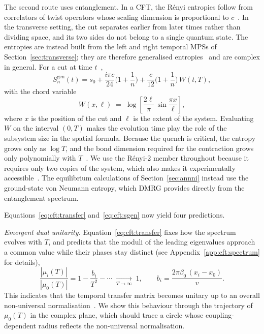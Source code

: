 The second route uses entanglement. In a \ac{CFT}, the R\'enyi entropies follow from correlators of twist operators whose scaling dimension is proportional to $c$~\cite{calabrese_cardy2004}. In the transverse setting, the cut separates earlier from later times rather than dividing space, and its two sides do not belong to a single quantum state. The entropies are instead built from the left and right temporal \acp{MPS} of Section~\ref{sec:transverse}; they are therefore generalised entropies~\cite{doi2023} and are complex in general. For a cut at time $t$~\cite{carignano_tagliacozzo2025,boucomas2026},
\begin{equation}
  S_n^{\mathrm{gen}}(t) = s_0 + \frac{i\pi c}{24}\Big(1+\frac{1}{n}\Big)
  + \frac{c}{12}\Big(1+\frac{1}{n}\Big)\,W(t,T),
  \label{eq:cft:sgen}
\end{equation}
with the chord variable
\begin{equation}
  W(x,\ell) \;=\; \log\!\left[\frac{2\ell}{\pi}\,\sin\frac{\pi x}{\ell}\right],
  \label{eq:chord}
\end{equation}
where $x$ is the position of the cut and $\ell$ is the extent of the system. Evaluating $W$ on the interval $(0,T)$ makes the evolution time play the role of the subsystem size in the spatial formula. Because the quench is critical, the entropy grows only as $\log T$, and the bond dimension required for the contraction grows only polynomially with $T$~\cite{schuch2008,paeckel2019}. We use the R\'enyi-2 member throughout because it requires only two copies of the system, which also makes it experimentally accessible~\cite{boucomas2026measuring}. The equilibrium calculations of Section~\ref{sec:annni} instead use the ground-state von Neumann entropy, which \ac{DMRG} provides directly from the entanglement spectrum.

Equations~\eqref{eq:cft:transfer} and~\eqref{eq:cft:sgen} now yield four predictions.

\textit{Emergent dual unitarity.} Equation~\eqref{eq:cft:transfer} fixes how the spectrum evolves with $T$, and predicts that the moduli of the leading eigenvalues approach a common value while their phases stay distinct (see Appendix~\ref{app:cft:spectrum} for details),
\begin{equation}
  \frac{|\mu_i(T)|}{|\mu_0(T)|}
  = 1 - \frac{b_i}{T^2} - \cdots
  \;\xrightarrow[T\to\infty]{}\; 1 ,
  \qquad b_i = \frac{2\pi\beta_0\,(x_i-x_0)}{v}.
  \label{eq:gapclose}
\end{equation}
This indicates that the temporal transfer matrix becomes unitary up to an overall non-universal normalisation~\cite{bertini2019,carignano_tagliacozzo2025}. We show this behaviour through the trajectory of $\mu_0(T)$ in the complex plane, which should trace a circle whose coupling-dependent radius reflects the non-universal normalisation.

